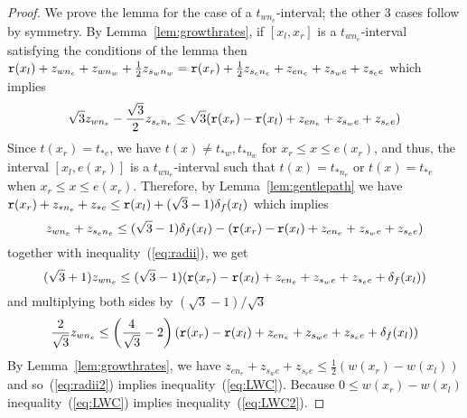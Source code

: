 \begin{proof}
We prove the lemma for the case of a $t_{wn_e}$-interval; the other 3 cases
follow by symmetry. By Lemma~\ref{lem:growthrates}, if
$[x_l,x_r]$ is a $t_{wn_e}$-interval satisfying the conditions of the lemma then
${\tt r}(x_l)+z_{wn_e}+z_{wn_w}+\frac{1}{2}z_{s_wn_w} = {\tt r}(x_r) + \frac{1}{2}z_{s_en_e}+z_{en_e}+z_{s_we} + z_{s_ee}$
which implies
\begin{equation}
\label{eq:radii}
\sqrt{3} z_{wn_e} - \frac{\sqrt{3}}{2}z_{s_en_e} \leq \sqrt{3}({\tt r}(x_r) - {\tt r}(x_l) + z_{en_e}+z_{s_we} + z_{s_ee})
\end{equation}
Since $t(x_r) = t_{\ast e}$, we have 
$t(x) \not= t_{\ast w}, t_{\ast n_w}$ for $x_r \leq x \leq e(x_r)$, and thus, the interval
$[x_l,e(x_r)]$ is a $t_{wn_e}$-interval such that $t(x) = t_{\ast n_e}$ or
$t(x) = t_{\ast e}$ when $x_r \leq x \leq e(x_r)$.  Therefore, 
by Lemma~\ref{lem:gentlepath} we have 
%
%
${\tt r}(x_r) + z_{\ast n_e} + z_{\ast e} \leq {\tt r}(x_l) + (\sqrt{3}-1)\delta_f(x_l)$
%
which implies
%
\[
z_{wn_e} + z_{s_en_e} \leq (\sqrt{3}-1)\delta_f(x_l) - ({\tt r}(x_r) - {\tt r}(x_l) + z_{en_e}+z_{s_we} + z_{s_ee})
	\]
%
together with inequality~(\ref{eq:radii}), we get
\[(\sqrt{3}+1)z_{wn_e} \leq (\sqrt{3}-1)({\tt r}(x_r) - {\tt r}(x_l) +z_{en_e}+z_{s_we}+z_{s_ee}+\delta_f(x_l))\]
and multiplying both sides by $(\sqrt{3} - 1)/\sqrt{3}$
\begin{equation}
\label{eq:radii2}
\frac{2}{\sqrt{3}}z_{wn_e} \leq \left(\frac{4}{\sqrt{3}}-2\right)({\tt r}(x_r) - {\tt r}(x_l) +z_{en_e}+z_{s_we}+z_{s_ee}+\delta_f(x_l))
\end{equation}
%
%
By Lemma~\ref{lem:growthrates}, we have
%
$z_{en_e}+z_{s_we}+z_{s_ee} \leq \frac{1}{2}(w(x_r) - w(x_l))$ and 
so~(\ref{eq:radii2}) implies inequality~(\ref{eq:LWC}).
%
Because $0 \leq w(x_r) - w(x_l)$ inequality~(\ref{eq:LWC}) implies
inequality~(\ref{eq:LWC2}). 
%
\end{proof}

